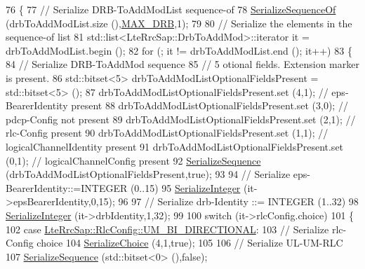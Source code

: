 \begin{DoxyCode}
76 \{
77   \textcolor{comment}{// Serialize DRB-ToAddModList sequence-of}
78   \hyperlink{classns3_1_1Asn1Header_a066b6dd077bde6b0c243f3eda2621277}{SerializeSequenceOf} (drbToAddModList.size (),\hyperlink{lte-rrc-header_8cc_a3007772924a76edef0d1eb9c400abdac}{MAX\_DRB},1);
79 
80   \textcolor{comment}{// Serialize the elements in the sequence-of list}
81   std::list<LteRrcSap::DrbToAddMod>::iterator it = drbToAddModList.begin ();
82   \textcolor{keywordflow}{for} (; it != drbToAddModList.end (); it++)
83     \{
84       \textcolor{comment}{// Serialize DRB-ToAddMod sequence}
85       \textcolor{comment}{// 5 otional fields. Extension marker is present.}
86       std::bitset<5> drbToAddModListOptionalFieldsPresent = std::bitset<5> ();
87       drbToAddModListOptionalFieldsPresent.set (4,1); \textcolor{comment}{// eps-BearerIdentity present}
88       drbToAddModListOptionalFieldsPresent.set (3,0); \textcolor{comment}{// pdcp-Config not present}
89       drbToAddModListOptionalFieldsPresent.set (2,1); \textcolor{comment}{// rlc-Config present}
90       drbToAddModListOptionalFieldsPresent.set (1,1); \textcolor{comment}{// logicalChannelIdentity present}
91       drbToAddModListOptionalFieldsPresent.set (0,1); \textcolor{comment}{// logicalChannelConfig present}
92       \hyperlink{classns3_1_1Asn1Header_aa9744858380443ed95836fed08799aed}{SerializeSequence} (drbToAddModListOptionalFieldsPresent,\textcolor{keyword}{true});
93 
94       \textcolor{comment}{// Serialize eps-BearerIdentity::=INTEGER (0..15)}
95       \hyperlink{classns3_1_1Asn1Header_ab1c3bd37730affa7473bc759d625c29a}{SerializeInteger} (it->epsBearerIdentity,0,15);
96 
97       \textcolor{comment}{// Serialize drb-Identity ::= INTEGER (1..32)}
98       \hyperlink{classns3_1_1Asn1Header_ab1c3bd37730affa7473bc759d625c29a}{SerializeInteger} (it->drbIdentity,1,32);
99 
100       \textcolor{keywordflow}{switch} (it->rlcConfig.choice)
101         \{
102         \textcolor{keywordflow}{case} \hyperlink{structns3_1_1LteRrcSap_1_1RlcConfig_ab6ab94ca4abaf717926f31db4dddc61ba55368feac1627138969235809e6eedc5}{LteRrcSap::RlcConfig::UM\_BI\_DIRECTIONAL}:
103           \textcolor{comment}{// Serialize rlc-Config choice}
104           \hyperlink{classns3_1_1Asn1Header_a400ef4a710499da80fc55e23a973d4fa}{SerializeChoice} (4,1,\textcolor{keyword}{true});
105 
106           \textcolor{comment}{// Serialize UL-UM-RLC}
107           \hyperlink{classns3_1_1Asn1Header_aa9744858380443ed95836fed08799aed}{SerializeSequence} (std::bitset<0> (),\textcolor{keyword}{false});

\end{DoxyCode}
